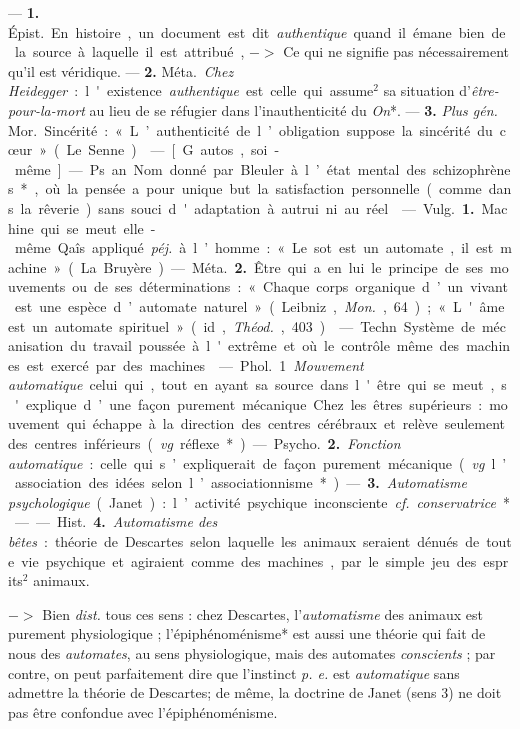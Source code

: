 \begin{itemize}[leftmargin=1cm, label=, itemsep=1pt]
{ —  {\bf 1.} \si{Épist.}
En histoire, un document est dit
{\it authentique} quand il émane bien de
la source à laquelle il est attribué,
$->$ Ce qui ne signifie pas nécessairement qu'il est véridique. —  {\bf 2.}
\si{Méta.} {\it Chez Heidegger} : l'existence
{\it authentique} est celle qui assume$^2$
sa situation d'{\it être-pour-la-mort} au
lieu de se réfugier dans l’inauthenticité du {\it On}*. — {\bf 3.} {\it Plus  {\it gén.}} \si{Mor.}
Sincérité : « L’authenticité de l’obligation suppose la sincérité du cœur »
(Le Senne).

 — [G. autos, soi-même] — Ps.
an. Nom donné par Bleuler à l’état
mental des schizophrènes*, où la
pensée a pour unique but la satisfaction personnelle (comme dans la
rêverie) sans souci d'adaptation à
autrui ni au réel.

 — \si{Vulg.} {\bf 1.} Machine qui se
meut elle-même. Qaîs. appliqué {\it péj.}
à l’homme : « Le sot est un automate,
il est machine » (La Bruyère).

— \si{Méta.} {\bf 2.} Être qui a en lui le
principe de ses mouvements ou de
ses déterminations : « Chaque corps
organique d’un vivant est une espèce
d’automate naturel » (Leibniz, {\it Mon.},
64); « L'âme est un automate spirituel » (id., {\it Théod.}, 403).

 — Techn. Système de
mécanisation du travail poussée à
l'extrême et où le contrôle même
des machines est exercé par des
machines.

 — \si{Phol.} 1 {\it Mouvement
automatique} celui qui, tout en
ayant sa source dans l'être qui se
meut, s'explique d’une façon purement mécanique. Chez les êtres
supérieurs : mouvement qui échappe
à la direction des centres cérébraux
et relève seulement des centres inférieurs ({\it vg}. réflexe*).

— \si{Psycho.} {\bf 2.} {\it Fonction automatique} : celle qui s’expliquerait de
façon purement mécanique ({\it vg}. l’association des idées selon
l’associationnisme*). — {\bf 3.} {\it Automatisme psychologique} (Janet) :
l’activité psychique inconsciente. {\it cf.}  {\it conservatrice}*.

—— \si{Hist.} {\bf 4.} {\it Automatisme des bêtes} :
théorie de Descartes selon laquelle
les animaux seraient dénués de toute
vie psychique et agiraient comme
des machines, par le simple jeu des
esprits$^2$ animaux.

$->$ Bien {\it dist.} tous ces sens :
chez Descartes, l’{\it automatisme} des
animaux est purement physiologique ; l’épiphénoménisme* est aussi
une théorie qui fait de nous des
{\it automates}, au sens physiologique,
mais des automates {\it conscients} ; par
contre, on peut parfaitement dire
que l'instinct {\it p. e.} est {\it automatique}
sans admettre la théorie de Descartes; de même, la doctrine de
Janet (sens 3) ne doit pas être confondue avec l’épiphénoménisme.

}
\end{itemize}
